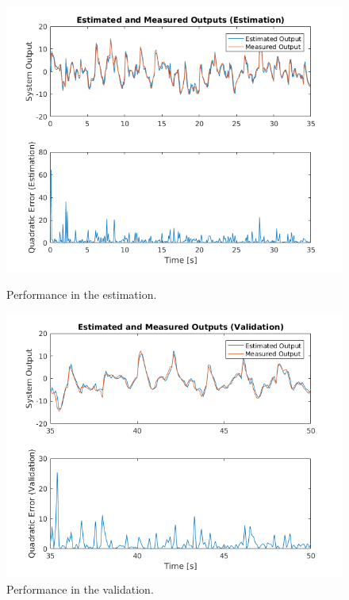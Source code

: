 \documentclass[11pt]{article}
\begin{document}
\begin{figure}[H]
	\centering
	\begin{minipage}{.5\textwidth}
		\centering
		\includegraphics[keepaspectratio=true, scale=0.35]{images/arx2_performance_estimation.png}
		\caption{Performance in the estimation.}
		\label{arx2_performance_estimation}
	\end{minipage}%
	\begin{minipage}{.5\textwidth}
		\centering
		\includegraphics[keepaspectratio=true, scale=0.35]{images/arx2_performance_validation.png}
		\caption{Performance in the validation.}
		\label{arx2_performance_validation}
	\end{minipage}
\end{figure}
\end{document}
